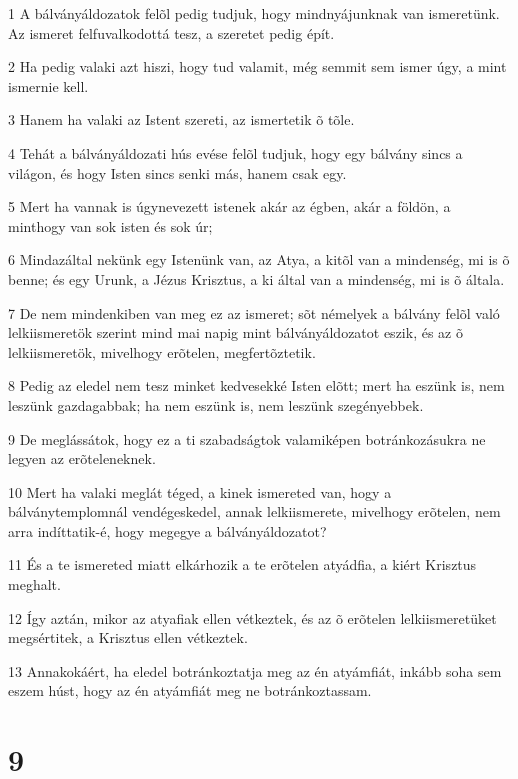 \par 1 A bálványáldozatok felõl pedig tudjuk, hogy mindnyájunknak van ismeretünk. Az ismeret felfuvalkodottá tesz, a szeretet pedig épít.
\par 2 Ha pedig valaki azt hiszi, hogy tud valamit, még semmit sem ismer úgy, a mint ismernie kell.
\par 3 Hanem ha valaki az Istent szereti, az ismertetik õ tõle.
\par 4 Tehát a bálványáldozati hús evése felõl tudjuk, hogy egy bálvány sincs a világon, és hogy Isten sincs senki más, hanem csak  egy.
\par 5 Mert ha vannak is úgynevezett istenek akár az égben, akár a földön, a minthogy van sok isten és sok úr;
\par 6 Mindazáltal nekünk egy Istenünk van, az Atya, a kitõl van a mindenség, mi is õ benne; és egy  Urunk, a Jézus Krisztus, a ki által van a mindenség, mi is õ általa.
\par 7 De nem mindenkiben van meg ez az ismeret; sõt némelyek a bálvány felõl való lelkiismeretök szerint mind mai napig mint bálványáldozatot eszik, és az õ lelkiismeretök, mivelhogy erõtelen,  megfertõztetik.
\par 8 Pedig az eledel nem tesz minket kedvesekké Isten elõtt; mert ha eszünk is, nem leszünk gazdagabbak; ha nem eszünk is, nem leszünk szegényebbek.
\par 9 De meglássátok, hogy ez a ti szabadságtok valamiképen botránkozásukra ne legyen az erõteleneknek.
\par 10 Mert ha valaki meglát téged, a kinek ismereted van, hogy a bálványtemplomnál vendégeskedel, annak lelkiismerete, mivelhogy erõtelen, nem arra indíttatik-é, hogy megegye a bálványáldozatot?
\par 11 És a te ismereted miatt elkárhozik a te erõtelen atyádfia, a kiért Krisztus meghalt.
\par 12 Így aztán, mikor az atyafiak ellen vétkeztek, és az õ erõtelen lelkiismeretüket megsértitek, a Krisztus ellen vétkeztek.
\par 13 Annakokáért, ha eledel botránkoztatja meg az én atyámfiát, inkább soha sem eszem húst, hogy az én atyámfiát meg ne  botránkoztassam.

\chapter{9}

